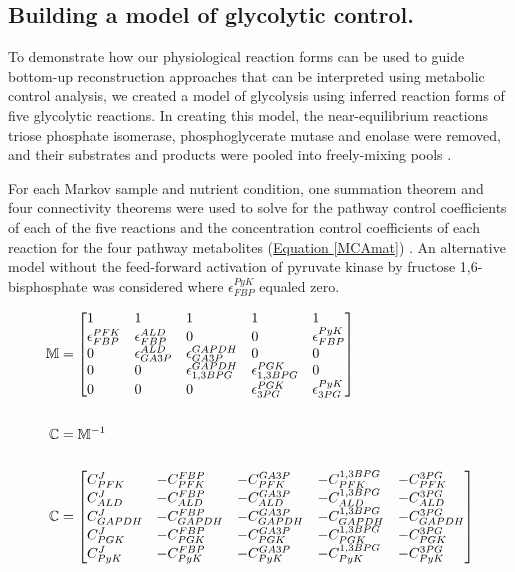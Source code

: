 \subsection*{Building a model of glycolytic control.}

To demonstrate how our physiological reaction forms can be used to guide bottom-up reconstruction approaches that can be interpreted using metabolic control analysis, we created a model of glycolysis using inferred reaction forms of five glycolytic reactions.  In creating this model, the near-equilibrium reactions triose phosphate isomerase, phosphoglycerate mutase and enolase were removed, and their substrates and products were pooled into freely-mixing pools \cite{Cortassa:1994is}.

For each Markov sample and nutrient condition, one summation theorem and four connectivity theorems were used to solve for the pathway control coefficients of each of the five reactions and the concentration control coefficients of each reaction for the four pathway metabolites (\hyperref[MCAmat]{Equation \ref{MCAmat}}) \cite{Westerhoff:1987jo}.  An alternative model without the feed-forward activation of pyruvate kinase by fructose 1,6-bisphosphate was considered where $\epsilon^{PyK}_{FBP}$ equaled zero.  

\begin{align}
\mathbb{M} &= \begin{bmatrix*}[l]
  1 & 1 & 1 & 1 & 1 \\
  \epsilon^{PFK}_{FBP} & \epsilon^{ALD}_{FBP} & 0 & 0 & \epsilon^{PyK}_{FBP} \\
  0 & \epsilon^{ALD}_{GA3P} & \epsilon^{GAPDH}_{GA3P} & 0 & 0 \\
  0 & 0 & \epsilon^{GAPDH}_{1,3BPG} & \epsilon^{PGK}_{1,3BPG} & 0 \\
  0 & 0 & 0 & \epsilon^{PGK}_{3PG} & \epsilon^{PyK}_{3PG} \\
 \end{bmatrix*}\notag\\\notag\\
  \mathbb{C} &= \mathbb{M}^{-1}\notag\\\notag\\
 \mathbb{C} &= \begin{bmatrix*}[l]
  C^{J}_{PFK} & -C^{FBP}_{PFK} & -C^{GA3P}_{PFK} & -C^{1,3BPG}_{PFK} & -C^{3PG}_{PFK} \\
  C^{J}_{ALD} & -C^{FBP}_{ALD} & -C^{GA3P}_{ALD} & -C^{1,3BPG}_{ALD} & -C^{3PG}_{ALD} \\
  C^{J}_{GAPDH} & -C^{FBP}_{GAPDH} & -C^{GA3P}_{GAPDH} & -C^{1,3BPG}_{GAPDH} & -C^{3PG}_{GAPDH} \\
  C^{J}_{PGK} & -C^{FBP}_{PGK} & -C^{GA3P}_{PGK} & -C^{1,3BPG}_{PGK} & -C^{3PG}_{PGK} \\
  C^{J}_{PyK} & -C^{FBP}_{PyK} & -C^{GA3P}_{PyK} & -C^{1,3BPG}_{PyK} & -C^{3PG}_{PyK}
 \end{bmatrix*}\label{MCAmat}
\end{align}

\makeatletter 
\renewcommand{\theequation}{\thechapter.\@arabic\c@equation}
\makeatother

